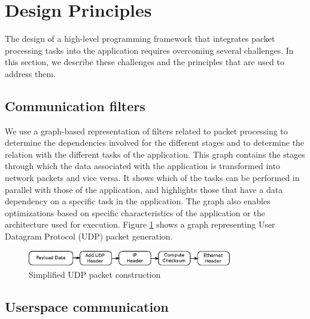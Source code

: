 \documentclass[10pt, conference, compsocconf, reqno]{IEEEtran}
\newcommand{\comment}[1]{}
\begin{document}
\section{Design Principles}
\label{dppl}

The design of a high-level programming framework that integrates packet processing tasks into the application requires overcoming several challenges. \comment{The entire system is driven by the extent to which parallelism can be extracted. Some of the techniques that can be applied to the packet processing tasks can be used for the tasks related to the application.} In this section, we describe these challenges and the principles that are used to address them. \comment{We focus on the methodologies related to the packet processing tasks and the parallel processing engine itself.}

\subsection{Communication filters}

\comment{Understanding the set of packet processing tasks associated with the application is essential to performing them in parallel.} We use a graph-based representation of filters related to packet processing to determine the dependencies involved for the different stages and to determine the relation with the different tasks of the application. This graph contains the stages through which the data associated with the application is transformed into network packets and vice versa. It shows which of the tasks can be performed in parallel with those of the application, and highlights those that have a data dependency on a specific task in the application. The graph also enables optimizations based on specific characteristics of the application or the architecture used for execution. Figure \ref{fig2} shows a graph representing User Datagram Protocol (UDP) packet generation.

\begin{figure}[ht]
\centering
\includegraphics[width=3.5in]{pack-op}
\caption{Simplified UDP packet construction}
\label{fig2}
\end{figure}

\subsection{Userspace communication}
\end{document}

